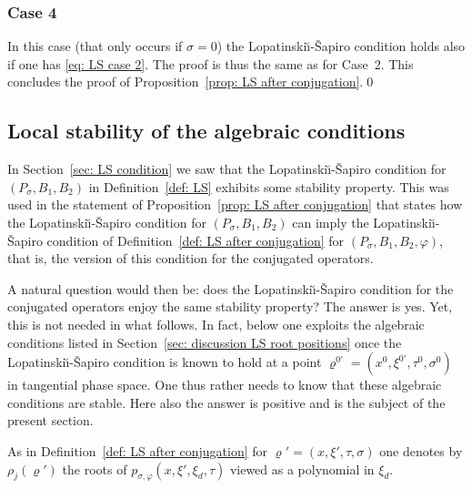 \documentclass[10pt]{amsart}
\theoremstyle{plain}
\theoremstyle{definition}
\newcommand{\LS}{Lopatinski\u{\i}-\v{S}apiro\xspace}
\let\y\varrho
\newcommand{\Psig}{P_{\sigma}}
\newcommand{\pconj}{p_{\sigma,\varphi}}
\begin{document}
\subsubsection*{Case 4}
In this case (that only occurs if $\sigma=0$) the \LS condition
holds also if one has \eqref{eq: LS case 2}. The proof is thus
the same as for Case~2. This concludes the proof of
Proposition~\ref{prop: LS after conjugation}.\qed

\subsection{Local stability of the algebraic conditions}
\label{sec: Stability LS-conj}
In Section~\ref{sec: LS condition} we saw that the \LS condition for
$(\Psig, B_1, B_2)$ in Definition~\ref{def: LS} exhibits some stability
property. This was used in the statement of Proposition~\ref{prop: LS
after conjugation} that states how the \LS condition for
$(\Psig, B_1, B_2)$ can imply the \LS condition of
Definition~\ref{def: LS after conjugation} for
$(\Psig, B_1, B_2, \varphi)$, that is, the version of this condition
for the conjugated operators.

A natural question would then be: does the \LS condition for the
conjugated operators enjoy the same stability property? The answer is
yes. Yet, this is not needed in what follows. In fact, below one
exploits the algebraic conditions listed in Section~\ref{sec: discussion LS root positions} once the
\LS condition is known to hold at a point $\y^{0\prime} = (x^0,
\xi^{0\prime}, \tau^0, \sigma^0)$ in tangential
phase space. One thus rather needs to know that these algebraic
conditions are stable. Here also the answer is positive and is the
subject of the present section.

As in Definition~\ref{def: LS after conjugation} for $\y' =(x,\xi',\tau,\sigma)$ one denotes by
$\rho_j (\y')$
the roots of $\pconj(x,\xi',\xi_d, \tau)$ viewed as a polynomial in
$\xi_d$.
\end{document}
